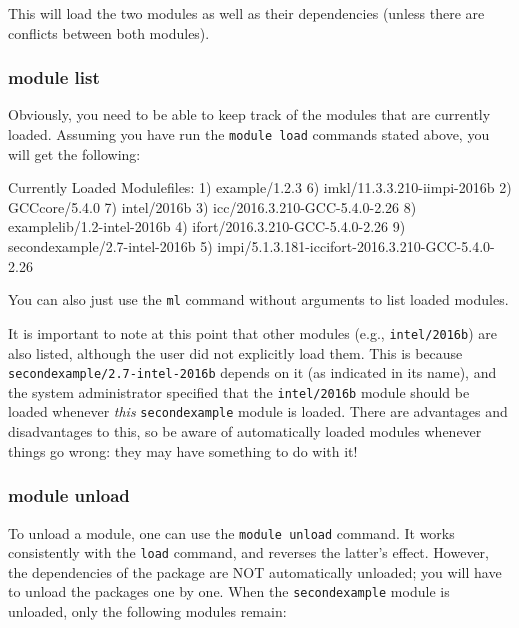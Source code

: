 This will load the two modules as well as their dependencies (unless there are conflicts between both modules).

\subsubsection{module list}

Obviously, you need to be able to keep track of the modules that are currently
loaded. Assuming you have run the \lstinline|module load| commands stated above,
you will get the following:

\begin{prompt}
Currently Loaded Modulefiles:
1) example/1.2.3                                          6) imkl/11.3.3.210-iimpi-2016b
2) GCCcore/5.4.0                                          7) intel/2016b
3) icc/2016.3.210-GCC-5.4.0-2.26                          8) examplelib/1.2-intel-2016b
4) ifort/2016.3.210-GCC-5.4.0-2.26                        9) secondexample/2.7-intel-2016b
5) impi/5.1.3.181-iccifort-2016.3.210-GCC-5.4.0-2.26

\end{prompt}

\ifusinglmod
You can also just use the \lstinline|ml| command without arguments to list loaded modules.
\fi

It is important to note at this point that other modules (e.g., \lstinline|intel/2016b|)
are also listed, although the user did not explicitly load them. This is
because \lstinline|secondexample/2.7-intel-2016b| depends on it (as indicated in its name),
and the system administrator specified that the \lstinline|intel/2016b| module should
be loaded whenever \emph{this} \lstinline|secondexample| module is loaded. There are advantages and
disadvantages to this, so be aware of automatically loaded modules whenever
things go wrong: they may have something to do with it!

\subsubsection{module unload}

To unload a module, one can use the \lstinline|module unload| command. It works
consistently with the \lstinline|load| command, and reverses the latter's effect. However,
the dependencies of the package are NOT automatically unloaded; you will have to
unload the packages one by one. When the \lstinline|secondexample| module is unloaded,
only the following modules remain:

